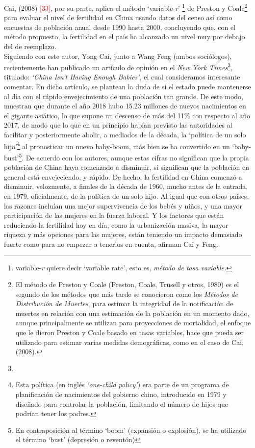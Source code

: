 Cai, (2008) \textcolor{red}{[33]}, por su parte, aplica el método `variable-\textit{r}' \footnote{variable-\textit{r} quiere decir `variable rate', esto es, \textit{método de tasa variable.}} de Preston y Coale\footnote{El método de Preston y Coale (Preston, Coale, Trusell y otros, 1980) es el segundo de los métodos que más tarde se conocieron como los \textit{Métodos de Distribución de Muertes}, para estimar la integridad de la notificación de muertes en relación con una estimación de la población en un momento dado, aunque principalmente se utilizan para proyecciones de mortalidad, el enfoque que le dieron Preston y Coale basado en tasas variables, hace que pueda ser utilizado para estimar varias medidas demográficas, como en el caso de Cai, (2008).} para evaluar el nivel de fertilidad en China usando datos del censo así como encuestas de población anual desde 1990 hasta 2000, concluyendo que, con el método propuesto, la fertilidad en el país ha alcanzado un nivel muy por debajo del de reemplazo.\\
Siguiendo con este autor, Yong Cai, junto a Wang Feng (ambos sociólogos), recientemente han publicado un artículo de opinión en el \textit{New York Times}\footnote{}, titulado: \textit{`China Isn't Having Enough Babies'}, el cual consideramos interesante comentar. En dicho artículo, se plantean la duda de si el estado puede mantenerse al día con el rápido envejecimiento de una población tan grande. De este modo, muestran que durante el año 2018 hubo 15.23 millones de nuevos nacimientos en el gigante asiático, lo que supone un descenso de más del 11\% con respecto al año 2017, de modo que lo que en un principio habían previsto las autoridades al facilitar y posteriormente abolir, a mediados de la década, la `política de un solo hijo'\footnote{Esta política (en inglés \textit{`one-child policy'}) era parte de un programa de planificación de nacimientos del gobierno chino, introducido en 1979 y diseñado para controlar la población, limitando el número de hijos que podrían tener los padres.} al pronosticar un nuevo baby-boom, más bien se ha convertido en un `baby-bust'\footnote{En contraposición al término `boom' (expansión o explosión), se ha utilizado el término `bust' (depresión o reventón)}.
De acuerdo con los autores, aunque estas cifras no significan que la propia población de China haya comenzado a disminuir, sí significan que la población en general está envejeciendo, y rápido. De hecho, la fertilidad en China comenzó a disminuir, velozmente, a finales de la década de 1960, mucho antes de la entrada, en 1979, oficialmente, de la política de un solo hijo. Al igual que con otros países, las razones incluían una mejor supervivencia de los bebés y niños, y una mayor participación de las mujeres en la fuerza laboral. Y los factores que están reduciendo la fertilidad hoy en día, como la urbanización masiva, la mayor riqueza y más opciones para las mujeres, están teniendo un impacto demasiado fuerte como para no empezar a tenerlos en cuenta, afirman Cai y Feng.\\ 
